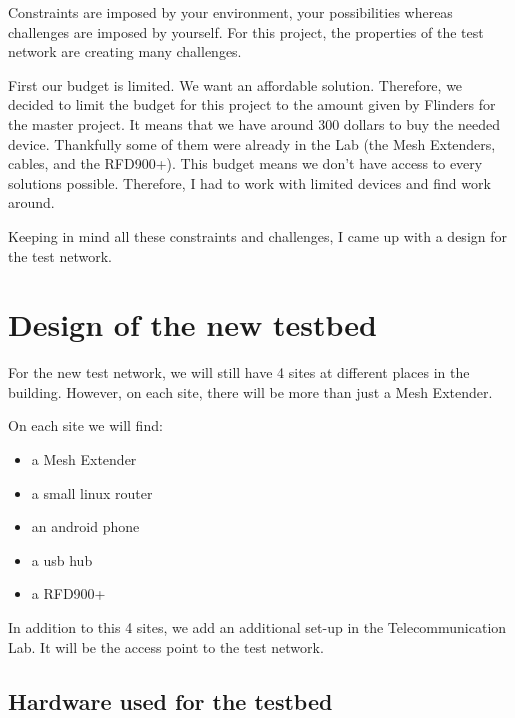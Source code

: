 Constraints are imposed by your environment, your possibilities whereas challenges are imposed by yourself. For this project, the properties of the test network are creating many challenges.

First our budget is limited. We want an affordable solution. Therefore, we decided to limit the budget for this project to the amount given by Flinders for the master project. It means that we have around 300 dollars to buy the needed device. Thankfully some of them were already in the Lab (the Mesh Extenders, cables, and the RFD900+). This budget means we don't have access to every solutions possible. Therefore, I had to work with limited devices and find work around.



Keeping in mind all these constraints and challenges, I came up with a design for the test network. 







\section{Design of the new testbed}


For the new test network, we will still have 4 sites at different places in the building. However, on each site, there will be more than just a Mesh Extender.

On each site we will find:
\begin{itemize}
	\item a Mesh Extender
	\item a small linux router
	\item an android phone
	\item a usb hub
	\item a RFD900+
\end{itemize}


In addition to this 4 sites, we add an additional set-up in the Telecommunication Lab. It will be the access point to the test network.

\subsection{Hardware used for the testbed}

